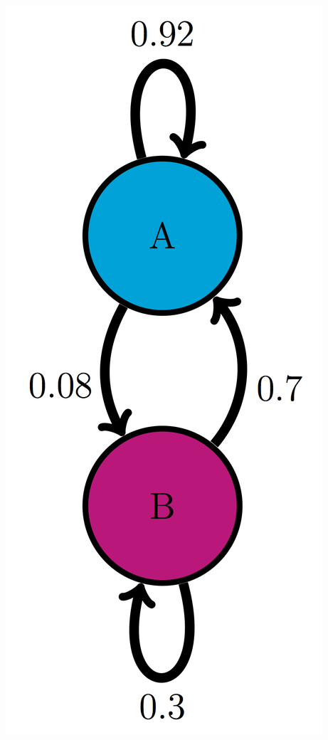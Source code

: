 \documentclass[
  letterpaper,
  DIV=11,
  numbers=noendperiod]{scrreprt}
\begin{document}
\includegraphics{./ch10/AB_trans_diag.png}
\end{document}
